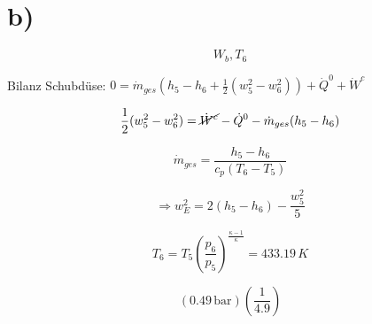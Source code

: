 

\section*{b)}

\[ W_{b}, T_{6} \]

Bilanz Schubdüse: \( 0 = \dot{m}_{ges} (h_{5} - h_{6} + \frac{1}{2} (w_{5}^{2} - w_{6}^{2})) + \dot{Q}^{0} + \dot{W}^{c} \)

\[ \frac{1}{2} (w_{5}^{2} - w_{6}^{2}) = \cancel{\dot{W}^{c}} - \dot{Q}^{0} - \dot{m}_{ges} (h_{5} - h_{6}) \]

\[ \dot{m}_{ges} = \frac{h_{5} - h_{6}}{c_{p} (T_{6} - T_{5})} \]

\[ \Rightarrow w_{E}^{2} = 2 (h_{5} - h_{6}) - \frac{w_{5}^{2}}{5} \]

\[ T_{6} = T_{5} \left( \frac{p_{6}}{p_{5}} \right)^{\frac{\kappa - 1}{\kappa}} = 433.19 \, K \]

\[ \left( 0.49 \, \text{bar} \right) \left( \frac{1}{4.9} \right) \]